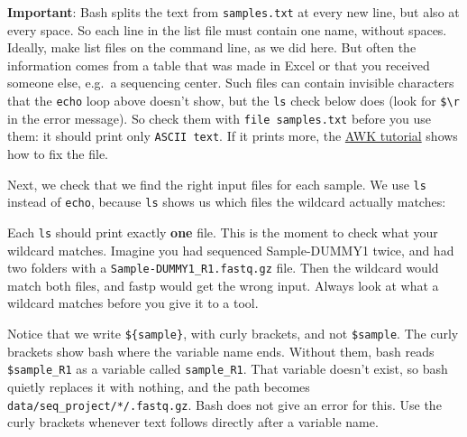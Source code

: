\documentclass[
  letterpaper,
  DIV=11,
  numbers=noendperiod]{scrreprt}
\newenvironment{Shaded}{}{}
\newcommand{\BuiltInTok}[1]{\textcolor[rgb]{0.84,0.23,0.29}{#1}}
\newcommand{\ControlFlowTok}[1]{\textcolor[rgb]{0.84,0.23,0.29}{#1}}
\newcommand{\FunctionTok}[1]{\textcolor[rgb]{0.44,0.26,0.76}{#1}}
\newcommand{\KeywordTok}[1]{\textcolor[rgb]{0.84,0.23,0.29}{#1}}
\newcommand{\NormalTok}[1]{\textcolor[rgb]{0.14,0.16,0.18}{#1}}
\newcommand{\PreprocessorTok}[1]{\textcolor[rgb]{0.84,0.23,0.29}{#1}}
\newcommand{\StringTok}[1]{\textcolor[rgb]{0.01,0.18,0.38}{#1}}
\newcommand{\VariableTok}[1]{\textcolor[rgb]{0.89,0.38,0.04}{#1}}
\begin{document}
\textbf{Important}: Bash splits the text from \texttt{samples.txt} at
every new line, but also at every space. So each line in the list file
must contain one name, without spaces. Ideally, make list files on the
command line, as we did here. But often the information comes from a
table that was made in Excel or that you received someone else, e.g.~a
sequencing center. Such files can contain invisible characters that the
\texttt{echo} loop above doesn't show, but the \texttt{ls} check below
does (look for
\texttt{\$\textquotesingle{}\textbackslash{}r\textquotesingle{}} in the
error message). So check them with \texttt{file\ samples.txt} before you
use them: it should print only \texttt{ASCII\ text}. If it prints more,
the
\href{https://ndombrowski.github.io/AWK_tutorial/source/sed_basics.html\#windows-line-endings}{AWK
tutorial} shows how to fix the file.

Next, we check that we find the right input files for each sample. We
use \texttt{ls} instead of \texttt{echo}, because \texttt{ls} shows us
which files the wildcard actually matches:

\begin{Shaded}
\end{Shaded}

Each \texttt{ls} should print exactly \textbf{one} file. This is the
moment to check what your wildcard matches. Imagine you had sequenced
Sample-DUMMY1 twice, and had two folders with a
\texttt{Sample-DUMMY1\_R1.fastq.gz} file. Then the wildcard would match
both files, and fastp would get the wrong input. Always look at what a
wildcard matches before you give it to a tool.

Notice that we write \texttt{\$\{sample\}}, with curly brackets, and not
\texttt{\$sample}. The curly brackets show bash where the variable name
ends. Without them, bash reads \texttt{\$sample\_R1} as a variable
called \texttt{sample\_R1}. That variable doesn't exist, so bash quietly
replaces it with nothing, and the path becomes
\texttt{data/seq\_project/*/.fastq.gz}. Bash does not give an error for
this. Use the curly brackets whenever text follows directly after a
variable name.
\end{document}
